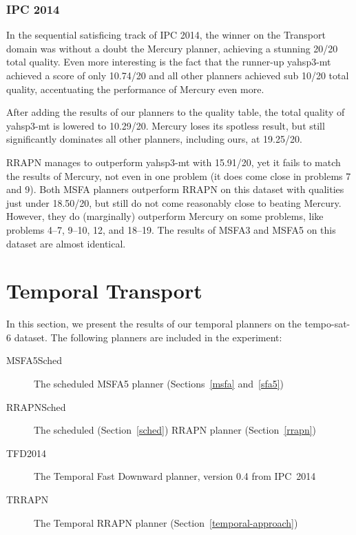 \subsubsection{IPC 2014}

In the sequential satisficing track of IPC 2014, the winner on the Transport domain
was without a doubt the Mercury planner, achieving
a stunning 20/20 total quality. Even more interesting is the fact that
the runner-up yahsp3-mt achieved a score of only 10.74/20
and all other planners achieved sub 10/20 total quality,
accentuating the performance of Mercury even more.

After adding the results of our planners to the quality table,
the total quality of yahsp3-mt is lowered to 10.29/20.
Mercury loses its spotless result, but still significantly dominates all
other planners, including ours, at 19.25/20.

RRAPN manages to outperform yahsp3-mt with 15.91/20, yet it fails
to match the results of Mercury, not even in one problem (it does come close in problems 7 and 9).
Both MSFA planners outperform RRAPN on this dataset with qualities just under 18.50/20,
but still do not come reasonably close to beating Mercury.
However, they do (marginally) outperform Mercury on some problems, like
problems 4--7, 9--10, 12, and 18--19.
The results of MSFA3 and MSFA5 on this dataset are almost identical.

















\section{Temporal Transport}

In this section, we present the results of our temporal planners on the tempo-sat-6 dataset. The following planners are included in the experiment:
\begin{description}
\item[MSFA5Sched] The scheduled MSFA5 planner (Sections~\ref{msfa} and~\ref{sfa5})
\item[RRAPNSched] The scheduled (Section~\ref{sched}) RRAPN planner (Section~\ref{rrapn})
\item[TFD2014] The Temporal Fast Downward planner, version 0.4 from IPC~2014 \citep[Preferring Preferred Operators in Temporal Fast Downward]{Vallati2015}
\item[TRRAPN] The Temporal RRAPN planner (Section~\ref{temporal-approach})
\end{description}

